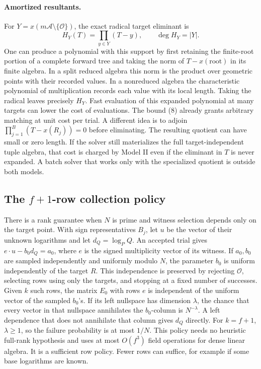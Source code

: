 \documentclass[11pt]{article}
\newcommand{\OO}{\mathcal O}
\newcommand{\A}{\mathcal A}
\begin{document}
\paragraph{Amortized resultants.}
For \(Y=x(m\A\setminus\{\OO\})\), the exact radical target eliminant is
\[
  H_Y(T)=\prod_{y\in Y}(T-y),\qquad \deg H_Y=|Y|.
\]
One can produce a polynomial with this support by first retaining the finite-root portion of a complete forward tree and taking the norm of \(T-x(\mathrm{root})\) in its finite algebra. In a split reduced algebra this norm is the product over geometric points with their recorded values. In a nonreduced algebra the characteristic polynomial of multiplication records each value with its local length. Taking the radical leaves precisely \(H_Y\). Fast evaluation of this expanded polynomial at many targets can lower the cost of evaluations. The bound (8) already grants arbitrary matching at unit cost per trial. A different idea is to adjoin \(\prod_{j=1}^B(T-x(R_j))=0\) before eliminating. The resulting quotient can have small or zero length. If the solver still materializes the full target-independent tuple algebra, that cost is charged by Model II even if the eliminant in \(T\) is never expanded. A batch solver that works only with the specialized quotient is outside both models.

\subsection*{The \(f+1\)-row collection policy}

There is a rank guarantee when \(N\) is prime and witness selection depends only on the target point. With sign representatives \(B_j\), let \(u\) be the vector of their unknown logarithms and let \(d_Q=\log_P Q\). An accepted trial gives \(e\cdot u-b_0d_Q=a_0\), where \(e\) is the signed multiplicity vector of its witness. If \(a_0,b_0\) are sampled independently and uniformly modulo \(N\), the parameter \(b_0\) is uniform independently of the target \(R\). This independence is preserved by rejecting \(\OO\), selecting rows using only the targets, and stopping at a fixed number of successes. Given \(k\) such rows, the matrix \(E_0\) with rows \(e\) is independent of the uniform vector of the sampled \(b_0\)'s. If its left nullspace has dimension \(\lambda\), the chance that every vector in that nullspace annihilates the \(b_0\)-column is \(N^{-\lambda}\). A left dependence that does not annihilate that column gives \(d_Q\) directly. For \(k=f+1\), \(\lambda\ge1\), so the failure probability is at most \(1/N\). This policy needs no heuristic full-rank hypothesis and uses at most \(O(f^3)\) field operations for dense linear algebra. It is a sufficient row policy. Fewer rows can suffice, for example if some base logarithms are known.
\end{document}
